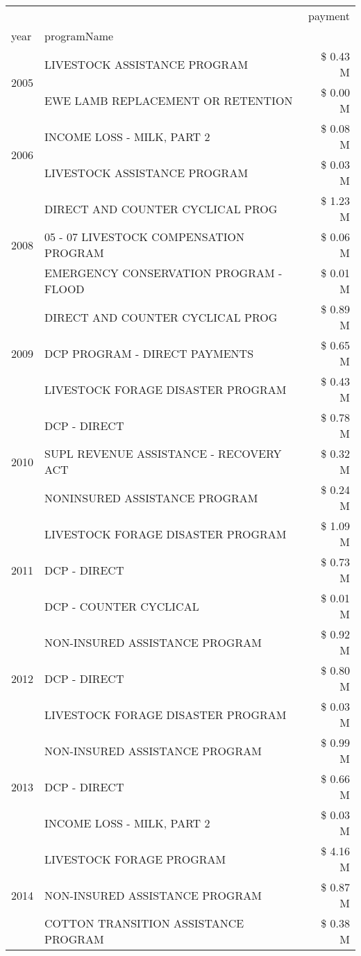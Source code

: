 \begin{tabular}{llr}
\toprule
 &  & payment \\
year & programName &  \\
\midrule
\multirow[t]{2}{*}{2005} & LIVESTOCK ASSISTANCE PROGRAM & \$ 0.43 M \\
 & EWE LAMB REPLACEMENT OR RETENTION & \$ 0.00 M \\
\cline{1-3}
\multirow[t]{2}{*}{2006} & INCOME LOSS - MILK, PART 2 & \$ 0.08 M \\
 & LIVESTOCK ASSISTANCE PROGRAM & \$ 0.03 M \\
\cline{1-3}
\multirow[t]{3}{*}{2008} & DIRECT AND COUNTER CYCLICAL PROG & \$ 1.23 M \\
 & 05 - 07 LIVESTOCK COMPENSATION PROGRAM & \$ 0.06 M \\
 & EMERGENCY CONSERVATION PROGRAM - FLOOD & \$ 0.01 M \\
\cline{1-3}
\multirow[t]{3}{*}{2009} & DIRECT AND COUNTER CYCLICAL PROG & \$ 0.89 M \\
 & DCP PROGRAM - DIRECT PAYMENTS & \$ 0.65 M \\
 & LIVESTOCK FORAGE DISASTER  PROGRAM & \$ 0.43 M \\
\cline{1-3}
\multirow[t]{3}{*}{2010} & DCP - DIRECT & \$ 0.78 M \\
 & SUPL REVENUE ASSISTANCE - RECOVERY ACT & \$ 0.32 M \\
 & NONINSURED ASSISTANCE PROGRAM & \$ 0.24 M \\
\cline{1-3}
\multirow[t]{3}{*}{2011} & LIVESTOCK FORAGE DISASTER PROGRAM & \$ 1.09 M \\
 & DCP - DIRECT & \$ 0.73 M \\
 & DCP - COUNTER CYCLICAL & \$ 0.01 M \\
\cline{1-3}
\multirow[t]{3}{*}{2012} & NON-INSURED ASSISTANCE PROGRAM & \$ 0.92 M \\
 & DCP - DIRECT & \$ 0.80 M \\
 & LIVESTOCK FORAGE DISASTER PROGRAM & \$ 0.03 M \\
\cline{1-3}
\multirow[t]{3}{*}{2013} & NON-INSURED ASSISTANCE PROGRAM & \$ 0.99 M \\
 & DCP - DIRECT & \$ 0.66 M \\
 & INCOME LOSS - MILK, PART 2 & \$ 0.03 M \\
\cline{1-3}
\multirow[t]{3}{*}{2014} & LIVESTOCK FORAGE PROGRAM & \$ 4.16 M \\
 & NON-INSURED ASSISTANCE PROGRAM & \$ 0.87 M \\
 & COTTON TRANSITION ASSISTANCE PROGRAM & \$ 0.38 M \\

\end{tabular}
